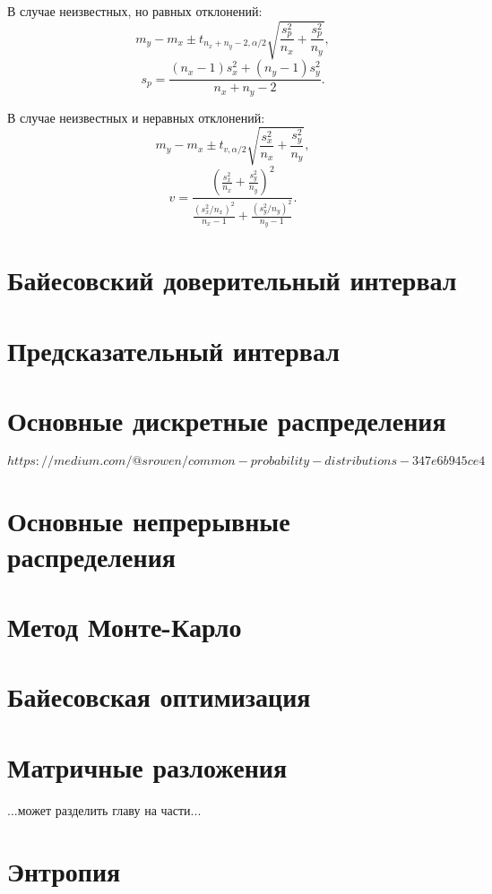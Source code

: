 В случае неизвестных, но равных отклонений:
$$
m_y - m_x \pm t_{n_x+n_y-2, \alpha/2}\sqrt{\frac{s_p^2}{n_x} + \frac{s_p^2}{n_y}},
$$
$$
s_p = \frac{(n_x - 1)s_x^2 + (n_y - 1)s_y^2}{n_x + n_y - 2}.
$$

В случае неизвестных и неравных отклонений:
$$
m_y - m_x \pm t_{v, \alpha/2}\sqrt{\frac{s_x^2}{n_x} + \frac{s_y^2}{n_y}},
$$
$$
v = \frac{\left(\frac{s_x^2}{n_x} + \frac{s_y^2}{n_y} \right)^2}{\frac{(s_x^2/n_x)^2}{n_x - 1} + \frac{(s_y^2/n_y)^2}{n_y - 1}}.
$$


\section{Байесовский доверительный интервал}


\section{Предсказательный интервал}


\section{Основные дискретные распределения}

$https://medium.com/@srowen/common-probability-distributions-347e6b945ce4$


\section{Основные непрерывные распределения}


\section{Метод Монте-Карло}


\section{Байесовская оптимизация}


\section{Матричные разложения}

...может разделить главу на части...


\section{Энтропия}

